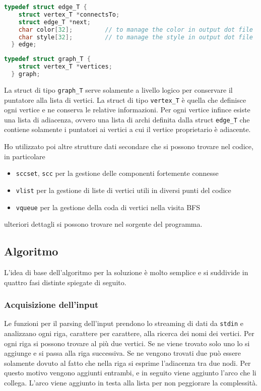 \documentclass[a4paper,8pt]{article}
\theoremstyle{definition}
\begin{document}
\begin{lstlisting}[language=C]
  typedef struct edge_T {
    struct vertex_T *connectsTo;
    struct edge_T *next;
    char color[32];         // to manage the color in output dot file
    char style[32];         // to manage the style in output dot file
  } edge;
\end{lstlisting}

\begin{lstlisting}[language=C]
  typedef struct graph_T {
    struct vertex_T *vertices;
  } graph;
\end{lstlisting}

\noindent
La struct di tipo \texttt{graph\_T} serve solamente a livello logico per conservare
il puntatore alla lista di vertici. La struct di tipo \texttt{vertex\_T} è quella
che definisce ogni vertice e ne conserva le relative informazioni. Per ogni vertice
infince esiste una lista di adiacenza, ovvero una lista di archi definita dalla
struct \texttt{edge\_T} che contiene solamente i puntatori ai vertici a cui il vertice
proprietario è adiacente.

Ho utilizzato poi altre strutture dati secondare che si possono trovare nel codice,
in particolare
\begin{itemize}
  \item \texttt{sccset}, \texttt{scc} per la gestione delle componenti fortemente
    connesse
  \item \texttt{vlist} per la gestione di liste di vertici utili in diversi punti
    del codice
  \item \texttt{vqueue} per la gestione della coda di vertici nella visita BFS
\end{itemize}
ulteriori dettagli si possono trovare nel sorgente del programma.

\subsection{Algoritmo}
L'idea di base dell'algoritmo per la soluzione è molto semplice e si suddivide in
quattro fasi distinte spiegate di seguito.

\subsubsection{Acquisizione dell'input}
Le funzioni per il parsing dell'input prendono lo streaming di dati da \texttt{stdin}
e analizzano ogni riga, carattere per carattere, alla ricerca dei nomi dei vertici.
Per ogni riga si possono trovare al più due vertici. Se ne viene trovato solo uno
lo si aggiunge e si passa alla riga successiva. Se ne vengono trovati due può essere
solamente dovuto al fatto che nella riga si esprime l'adiacenza tra due nodi. Per
questo motivo vengono aggiunti entrambi, e in seguito viene aggiunto l'arco che li
collega. L'arco viene aggiunto in testa alla lista per non peggiorare la complessità.
\end{document}
